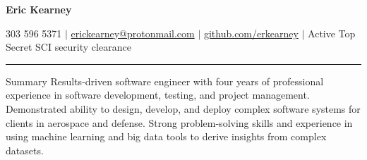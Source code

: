 \documentclass[8pt]{resumeclass}
\begin{document}
\centerline{\textbf{\LARGE{Eric Kearney}}}
\vspace{2pt}
\centerline{303 596 5371 $|$
\href{mailto:erickearney@protonmail.com}{erickearney@protonmail.com} $|$
\href{https://github.com/erkearney}{github.com/erkearney} $|$ Active Top Secret
SCI security clearance}
\vspace{2pt}
\rule{\textwidth}{0.4pt}
\vspace{0.5pt}

\resumesect
    {Summary}
    {Results-driven software engineer with four years of professional experience
    in software development, testing, and project management. Demonstrated
    ability to design, develop, and deploy complex software systems for clients
    in aerospace and defense. Strong problem-solving skills and experience in
    using machine learning and big data tools to derive insights from complex
    datasets.}
\vspace{8pt}
\end{document}
